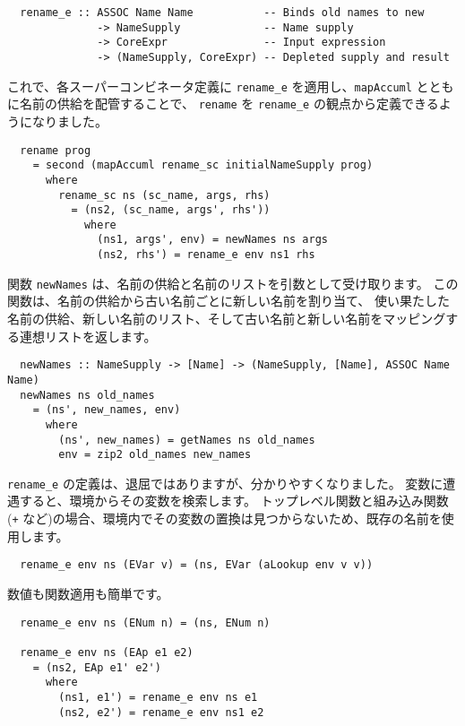 \documentclass{jarticle}
\begin{document}
\begin{verbatim}
  rename_e :: ASSOC Name Name           -- Binds old names to new
              -> NameSupply             -- Name supply
              -> CoreExpr               -- Input expression
              -> (NameSupply, CoreExpr) -- Depleted supply and result
\end{verbatim}

これで、各スーパーコンビネータ定義に \texttt{rename\_e} を適用し、\texttt{mapAccuml} とともに名前の供給を配管することで、
\texttt{rename} を \texttt{rename\_e} の観点から定義できるようになりました。

\begin{verbatim}
  rename prog
    = second (mapAccuml rename_sc initialNameSupply prog)
      where
        rename_sc ns (sc_name, args, rhs)
          = (ns2, (sc_name, args', rhs'))
            where
              (ns1, args', env) = newNames ns args
              (ns2, rhs') = rename_e env ns1 rhs
\end{verbatim}

関数 \texttt{newNames} は、名前の供給と名前のリストを引数として受け取ります。
この関数は、名前の供給から古い名前ごとに新しい名前を割り当て、
使い果たした名前の供給、新しい名前のリスト、そして古い名前と新しい名前をマッピングする連想リストを返します。

\begin{verbatim}
  newNames :: NameSupply -> [Name] -> (NameSupply, [Name], ASSOC Name Name)
  newNames ns old_names
    = (ns', new_names, env)
      where
        (ns', new_names) = getNames ns old_names
        env = zip2 old_names new_names
\end{verbatim}

\texttt{rename\_e} の定義は、退屈ではありますが、分かりやすくなりました。
変数に遭遇すると、環境からその変数を検索します。
トップレベル関数と組み込み関数(\texttt{+} など)の場合、環境内でその変数の置換は見つからないため、既存の名前を使用します。

\begin{verbatim}
  rename_e env ns (EVar v) = (ns, EVar (aLookup env v v))
\end{verbatim}

数値も関数適用も簡単です。

\begin{verbatim}
  rename_e env ns (ENum n) = (ns, ENum n)

  rename_e env ns (EAp e1 e2)
    = (ns2, EAp e1' e2')
      where
        (ns1, e1') = rename_e env ns e1
        (ns2, e2') = rename_e env ns1 e2
\end{verbatim}
\end{document}
